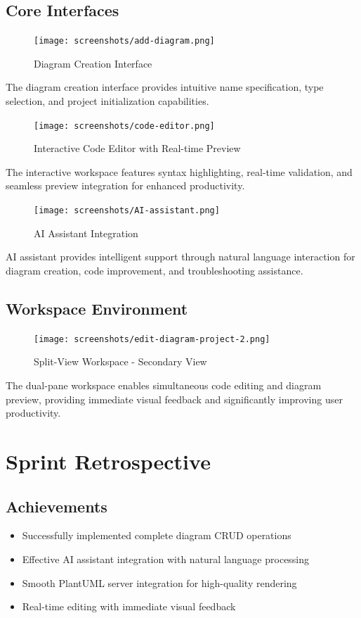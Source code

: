 \subsection{Core Interfaces}

\begin{figure}[H]
\centering
\texttt{[image: screenshots/add-diagram.png]}
\caption{Diagram Creation Interface}
\end{figure}

The diagram creation interface provides intuitive name specification, type selection, and project initialization capabilities.

\begin{figure}[H]
\centering
\texttt{[image: screenshots/code-editor.png]}
\caption{Interactive Code Editor with Real-time Preview}
\end{figure}

The interactive workspace features syntax highlighting, real-time validation, and seamless preview integration for enhanced productivity.

\begin{figure}[H]
\centering
\texttt{[image: screenshots/AI-assistant.png]}
\caption{AI Assistant Integration}
\end{figure}

AI assistant provides intelligent support through natural language interaction for diagram creation, code improvement, and troubleshooting assistance.

\subsection{Workspace Environment}


\begin{figure}[H]
\centering
\texttt{[image: screenshots/edit-diagram-project-2.png]}
\caption{Split-View Workspace - Secondary View}
\end{figure}

The dual-pane workspace enables simultaneous code editing and diagram preview, providing immediate visual feedback and significantly improving user productivity.

\section{Sprint Retrospective}

\subsection{Achievements}
\begin{itemize}
    \item Successfully implemented complete diagram CRUD operations
    \item Effective AI assistant integration with natural language processing
    \item Smooth PlantUML server integration for high-quality rendering
    \item Real-time editing with immediate visual feedback
\end{itemize}

